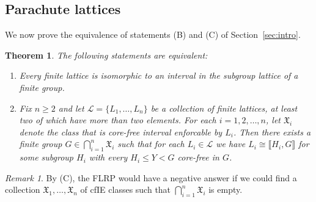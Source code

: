 \documentclass{gen-j-l}
\newcommand{\lb}{\ensuremath{\llbracket}}
\newcommand{\rb}{\ensuremath{\rrbracket}}
\newcommand{\<}{\ensuremath{\langle}}
\renewcommand{\>}{\ensuremath{\rangle}}
\theoremstyle{plain}
\newtheorem{theorem}{Theorem}[section]
\theoremstyle{definition}
\theoremstyle{remark}
\newtheorem*{remark}{Remark}
\numberwithin{theorem}{section}
\numberwithin{claim}{section}
\numberwithin{equation}{section}
\numberwithin{conjecture}{section}
\renewcommand{\leq}{\ensuremath{\leqslant}}
\renewcommand{\geq}{\ensuremath{\geqslant}}
\newcommand{\2}{\ensuremath{\mathbf{2}}}
\newcommand{\3}{\ensuremath{\mathbf{3}}}
\newcommand{\sG}{\ensuremath{\mathfrak{X}}}
\newcommand{\sL}{\ensuremath{\mathscr{L}}}
\begin{document}
\subsection{Parachute lattices}
\label{sec:parachute-lattices}
We now prove the equivalence of statements (B) and (C) 
of Section~\ref{sec:intro}.

\begin{theorem}
\label{thm-wjd-1}
The following statements are equivalent:
\begin{enumerate}
\item[(B)] Every finite lattice is isomorphic to
  an interval in the subgroup lattice of a finite group.

\item[(C)]
Fix $n\geq 2$ and let $\sL = \{L_1, \dots, L_n\}$ be a collection of
finite lattices, at least two of which have more than two elements.
For each $i = 1, 2, \dots, n$, let $\sG_i$ denote the class that is
core-free interval enforcable by $L_i$. Then there exists a finite group $G \in
\bigcap\limits_{i=1}^n \sG_i$ such that for 
each $L_i \in \sL$ we have $L_i\cong \lb H_i, G \rb$ for some subgroup
$H_i$ with every $H_i \leq Y <G$ core-free in $G$.
\end{enumerate}
\end{theorem}
\begin{remark}
By (C), the \acs{FLRP} would have a negative answer if we
could find a collection $\sG_1, \dots, \sG_n$ of \acs{cfIE} classes
such that $\bigcap\limits_{i=1}^n \sG_i$ is empty.
\end{remark}
\end{document}
